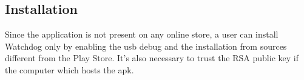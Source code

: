 \subsection{Installation}
\small{Since the application is not present on any online store, a user can install Watchdog only by enabling the usb debug and the installation from sources different from the Play Store. It's also necessary to trust the RSA public key if the computer which hosts the apk.}